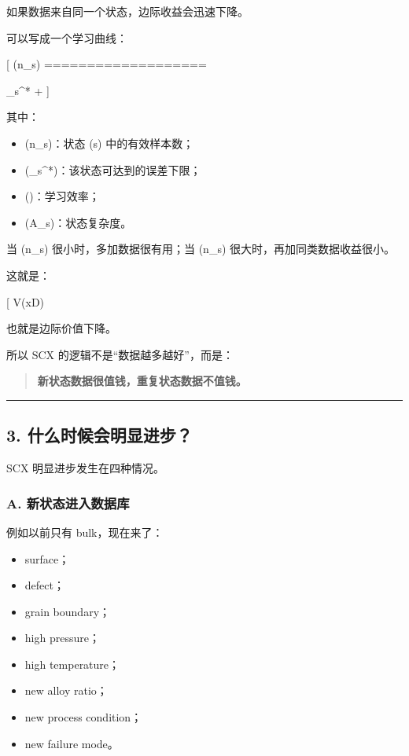 \documentclass[
  12pt,
]{ctexart}
\providecommand{\tightlist}{%
  \setlength{\itemsep}{0pt}\setlength{\parskip}{0pt}}
\begin{document}
如果数据来自同一个状态，边际收益会迅速下降。

可以写成一个学习曲线：

{[} (n\_s) ===================

\epsilon\_s\^{}* +  {]}

其中：

\begin{itemize}
\tightlist
\item
  (n\_s)：状态 (s) 中的有效样本数；
\item
  (\epsilon\_s\^{}*)：该状态可达到的误差下限；
\item
  (\alpha)：学习效率；
\item
  (A\_s)：状态复杂度。
\end{itemize}

当 (n\_s) 很小时，多加数据很有用；当 (n\_s)
很大时，再加同类数据收益很小。

这就是：

{[} \Delta V(x\mid \mathcal D) \downarrow{]}

也就是边际价值下降。

所以 SCX 的逻辑不是``数据越多越好''，而是：

\begin{quote}
\textbf{新状态数据很值钱，重复状态数据不值钱。}
\end{quote}

\begin{center}\rule{0.5\linewidth}{0.5pt}\end{center}

\subsection{3.
什么时候会明显进步？}\label{ux4ec0ux4e48ux65f6ux5019ux4f1aux660eux663eux8fdbux6b65}

SCX 明显进步发生在四种情况。

\subsubsection{A.
新状态进入数据库}\label{a.-ux65b0ux72b6ux6001ux8fdbux5165ux6570ux636eux5e93}

例如以前只有 bulk，现在来了：

\begin{itemize}
\tightlist
\item
  surface；
\item
  defect；
\item
  grain boundary；
\item
  high pressure；
\item
  high temperature；
\item
  new alloy ratio；
\item
  new process condition；
\item
  new failure mode。
\end{itemize}
\end{document}
